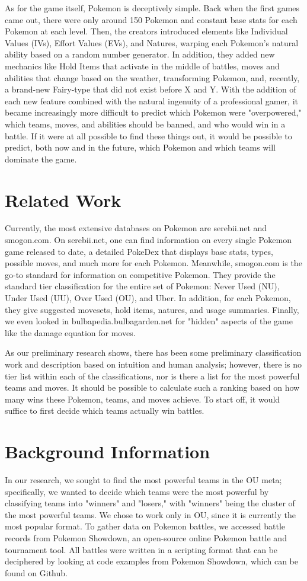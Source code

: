 \documentclass{acm_proc_article-sp}
\begin{document}
As for the game itself, Pokemon is deceptively simple. Back when the first games came out, there were only around 150 Pokemon and constant base stats for each Pokemon at each level. Then, the creators introduced elements like Individual Values (IVs), Effort Values (EVs), and Natures, warping each Pokemon's natural ability based on a random number generator. In addition, they added new mechanics like Hold Items that activate in the middle of battles, moves and abilities that change based on the weather, transforming Pokemon, and, recently, a brand-new Fairy-type that did not exist before X and Y. With the addition of each new feature combined with the natural ingenuity of a professional gamer, it became increasingly more difficult to predict which Pokemon were "overpowered," which teams, moves, and abilities should be banned, and who would win in a battle. If it were at all possible to find these things out, it would be possible to predict, both now and in the future, which Pokemon and which teams will dominate the game.

\section{Related Work}
Currently, the most extensive databases on Pokemon are serebii.net and smogon.com. On serebii.net, one can find information on every single Pokemon game released to date, a detailed PokeDex that displays base stats, types, possible moves, and much more for each Pokemon. Meanwhile, smogon.com is the go-to standard for information on competitive Pokemon. They provide the standard tier classification for the entire set of Pokemon: Never Used (NU), Under Used (UU), Over Used (OU), and Uber. In addition, for each Pokemon, they give suggested movesets, hold items, natures, and usage summaries. Finally, we even looked in bulbapedia.bulbagarden.net for "hidden" aspects of the game like the damage equation for moves.
	
As our preliminary research shows, there has been some preliminary classification work and description based on intuition and human analysis; however, there is no tier list within each of the classifications, nor is there a list for the most powerful teams and moves. It should be possible to calculate such a ranking based on how many wins these Pokemon, teams, and moves achieve. To start off, it would suffice to first decide which teams actually win battles.

\section{Background Information}
In our research, we sought to find the most powerful teams in the OU meta; specifically, we wanted to decide which teams were the most powerful by classifying teams into "winners" and "losers," with "winners" being the cluster of the most powerful teams. We chose to work only in OU, since it is currently the most popular format. To gather data on Pokemon battles, we accessed battle records from Pokemon Showdown, an open-source online Pokemon battle and tournament tool. All battles were written in a scripting format that can be deciphered by looking at code examples from Pokemon Showdown, which can be found on Github.
\end{document}

